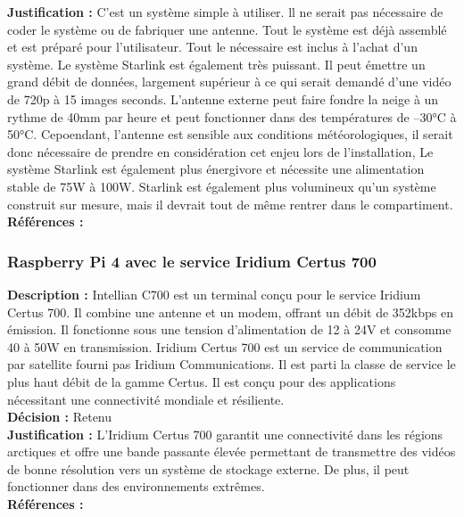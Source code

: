 \noindent
\textbf{Justification :} C’est un système simple à utiliser. ll ne serait pas nécessaire de coder le système ou de fabriquer une antenne. Tout le système est déjà assemblé et est préparé pour l’utilisateur. Tout le nécessaire est inclus à l’achat d’un système.
Le système Starlink est également très puissant. Il peut émettre un grand débit de données, largement supérieur à ce qui serait demandé d’une vidéo de 720p à 15 images seconds.
L’antenne externe peut faire fondre la neige à un rythme de 40mm par heure et peut fonctionner dans des températures de –30°C à 50°C.
Cepoendant, l’antenne est sensible aux conditions météorologiques, il serait donc nécessaire de prendre en considération cet enjeu lors de l’installation,
Le système Starlink est également plus énergivore et nécessite une alimentation stable de 75W à 100W.
Starlink est également plus volumineux qu’un système construit sur mesure, mais il devrait tout de même rentrer dans le compartiment. \\

\noindent
\textbf{Références :} \cite{28} \cite{29} \\

\subsubsection{Raspberry Pi 4 avec le service Iridium Certus 700}

\noindent
\textbf{Description :} Intellian C700 est un terminal conçu pour le service Iridium Certus
700. Il combine une antenne et un modem, offrant un débit de 352kbps en
émission. Il fonctionne sous une tension d’alimentation de 12 à 24V et consomme
40 à 50W en transmission. Iridium Certus 700 est un service de communication
par satellite fourni pas Iridium Communications. Il est parti la classe de
service le plus haut débit de la gamme Certus. Il est conçu pour des
applications nécessitant une connectivité mondiale et résiliente. \\

\noindent
\textbf{Décision :} Retenu \\

\noindent
\textbf{Justification :} L’Iridium Certus 700 garantit une connectivité dans les
régions arctiques et offre une bande passante élevée permettant de transmettre
des vidéos de bonne résolution vers un système de stockage externe. De plus, il
peut fonctionner dans des environnements extrêmes. \\

\noindent
\textbf{Références :} \\


